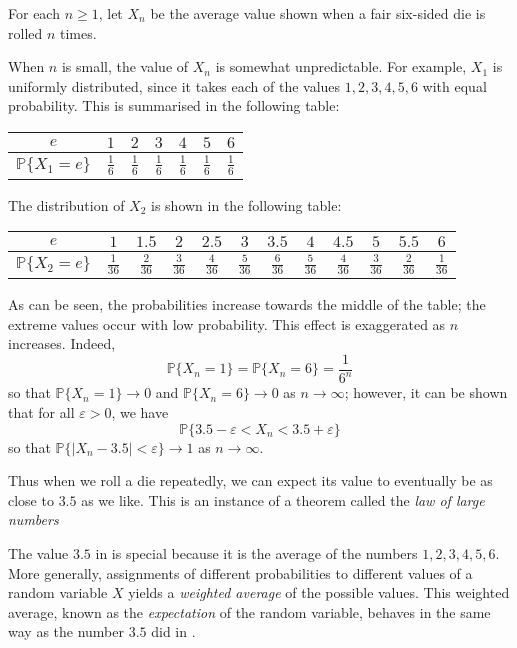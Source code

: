 \begin{example}
\label{exAverageDieRoll}
For each $n \ge 1$, let $X_n$ be the average value shown when a fair six-sided die is rolled $n$ times.

When $n$ is small, the value of $X_n$ is somewhat unpredictable. For example, $X_1$ is uniformly distributed, since it takes each of the values $1,2,3,4,5,6$ with equal probability. This is summarised in the following table:
\begin{center}
\begin{tabular}{c||c|c|c|c|c|c}
$e$ & $1$ & $2$ & $3$ & $4$ & $5$ & $6$ \\ \hline
$\mathbb{P}\{X_1=e\}$ & $\frac{1}{6}$ & $\frac{1}{6}$ & $\frac{1}{6}$ & $\frac{1}{6}$ & $\frac{1}{6}$ & $\frac{1}{6}$
\end{tabular}
\end{center}
The distribution of $X_2$ is shown in the following table:
\begin{center}
\begin{tabular}{c||c|c|c|c|c|c|c|c|c|c|c}
$e$ & $1$ & $1.5$ & $2$ & $2.5$ & $3$ & $3.5$ & $4$ & $4.5$ & $5$ & $5.5$ & $6$ \\ \hline
$\mathbb{P}\{X_2=e\}$ & $\frac{1}{36}$ & $\frac{2}{36}$ & $\frac{3}{36}$ & $\frac{4}{36}$ & $\frac{5}{36}$ & $\frac{6}{36}$ & $\frac{5}{36}$ & $\frac{4}{36}$ & $\frac{3}{36}$ & $\frac{2}{36}$ & $\frac{1}{36}$
\end{tabular}
\end{center}

As can be seen, the probabilities increase towards the middle of the table; the extreme values occur with low probability. This effect is exaggerated as $n$ increases. Indeed,
\[ \mathbb{P}\{X_n=1\} = \mathbb{P}\{ X_n=6 \} = \frac{1}{6^n} \]
so that $\mathbb{P} \{ X_n = 1 \} \to 0$ and $\mathbb{P} \{ X_n = 6 \} \to 0$ as $n \to \infty$; however, it can be shown that for all $\varepsilon > 0$, we have
\[ \mathbb{P} \{ 3.5 - \varepsilon < X_n < 3.5 + \varepsilon \} \]
so that $\mathbb{P} \{ |X_n - 3.5| < \varepsilon \} \to 1$ as $n \to \infty$.

Thus when we roll a die repeatedly, we can expect its value to eventually be as close to $3.5$ as we like. This is an instance of a theorem called the \textit{law of large numbers}
\end{example}

The value $3.5$ in  is special because it is the average of the numbers $1,2,3,4,5,6$. More generally, assignments of different probabilities to different values of a random variable $X$ yields a \textit{weighted average} of the possible values. This weighted average, known as the \textit{expectation} of the random variable, behaves in the same way as the number $3.5$ did in .

